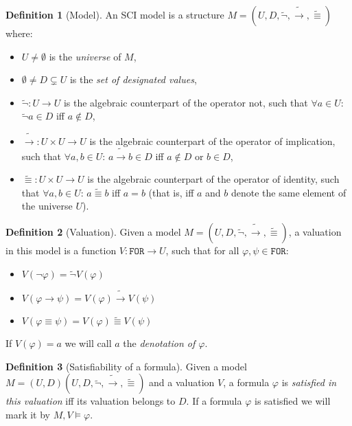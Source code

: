 \documentclass{article}
\theoremstyle{definition}
\newtheorem{definition}{Definition}[section]
\newcommand*{\id}{\equiv}
\newcommand*{\ra}{\rightarrow}
\newcommand*{\FOR}{\texttt{FOR}}
\begin{document}
\begin{definition}[Model]
    An SCI model is a structure $M = (U, D, \tilde{\lnot}, \tilde{\ra}, \tilde{\id})$ where:
    \begin{itemize}
        \item $U \not = \emptyset$ is the \emph{universe} of $M$,
        \item $\emptyset \not = D \subsetneq U$ is the \emph{set of designated values},
        \item $\tilde{\lnot}: U \longrightarrow U$ is the algebraic counterpart of the operator not, such that $\forall a \in U$: $\tilde{\lnot}a \in D$ iff $a \not \in D$,
        \item $\tilde{\ra}: U \times U \longrightarrow U$ is the algebraic counterpart of the operator of implication, such that $\forall a, b \in U$: $a \tilde{\ra} b \in D$ iff $a \not \in D$ or $b \in D$,
        \item $\tilde{\id}: U \times U \longrightarrow U$ is the algebraic counterpart of the operator of identity, such that $\forall a, b \in U$: $a \tilde{\id} b$ iff $a = b$ (that is, iff $a$ and $b$ denote the same element of the universe $U$).
    \end{itemize}
\end{definition}

\begin{definition}[Valuation]
    Given a model $M = (U, D, \tilde{\lnot}, \tilde{\ra}, \tilde{\id})$, a valuation in this model is a function $V : \FOR \longrightarrow U$, such that for all $\varphi, \psi \in \FOR$:
    \begin{itemize}
        \item $V(\lnot \varphi) = \tilde{\lnot}V(\varphi)$
        \item $V(\varphi \ra \psi) = V(\varphi) \tilde{\ra} V(\psi)$
        \item $V(\varphi \id \psi) = V(\varphi) \tilde{\id} V(\psi)$
    \end{itemize}
    If $V(\varphi) = a$ we will call $a$ the \emph{denotation of $\varphi$}.
\end{definition}

\begin{definition}[Satisfiability of a formula]
    Given a model $M = (U, D)(U, D, \tilde{\lnot}, \tilde{\ra}, \tilde{\id})$ and a valuation $V$, a formula $\varphi$ is \emph{satisfied in this valuation} iff its valuation belongs to $D$. If a formula $\varphi$ is satisfied we will mark it by $M, V \models \varphi$.
\end{definition}
\end{document}
